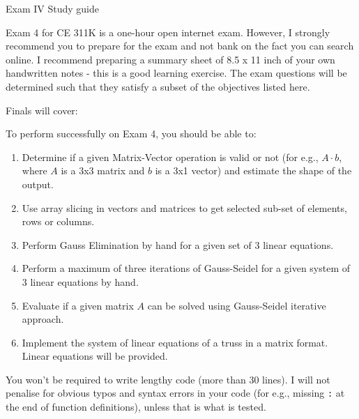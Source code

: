 \documentclass[]{article}
\begin{document}
\begin{center}
\Large Exam IV Study guide
\end{center}

Exam 4 for CE 311K is a one-hour open internet exam. However, I strongly recommend you to prepare for the exam and not bank on the fact you can search online. I recommend preparing a summary sheet of 8.5 x 11 inch of your own handwritten notes - this is a good learning exercise. The exam questions will be determined such that they satisfy a subset of the objectives listed here.

Finals will cover:
\begin{itemize}
	\item vectors, matrices, solution of linear system of equations. }
	\item Relevant assignments and labs
\end{itemize}


To perform successfully on Exam 4, you should be able to:

\begin{enumerate}
	\item Determine if a given Matrix-Vector operation is valid or not (for e.g., $A\cdot b$, where $A$ is a 3x3 matrix and $b$ is a 3x1 vector) and estimate the shape of the output.
	\item Use array slicing in vectors and matrices to get selected sub-set of elements, rows or columns.
	\item Perform Gauss Elimination by hand for a given set of 3 linear equations.
	\item Perform a maximum of three iterations of Gauss-Seidel for a given system of 3 linear equations by hand.
	\item Evaluate if a given matrix $A$ can be solved using Gauss-Seidel iterative approach.
	\item Implement the system of linear equations of a truss in a matrix format. Linear equations will be provided.

\end{enumerate}

You won't be required to write lengthy code (more than 30 lines). I will not penalise for obvious typos and syntax errors in your code (for e.g., missing \verb|:| at the end of function definitions), unless that is what is tested.
\end{document}

